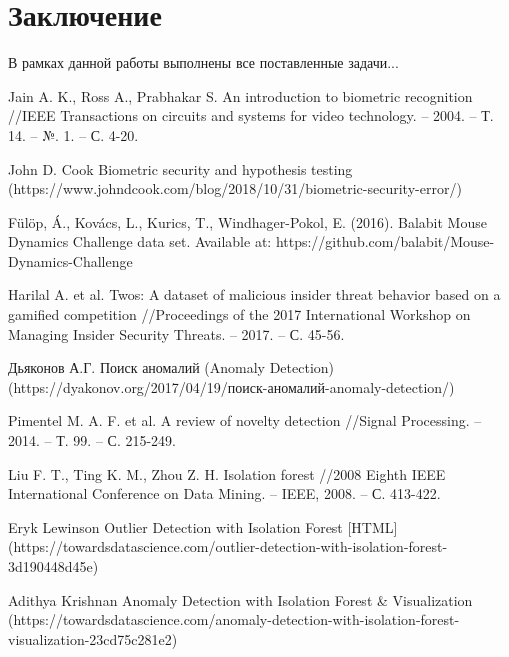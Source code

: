 \documentclass[12pt]{article}
\begin{document}
    \newpage



    \section{Заключение}
    \label{sec:Conclusion}

    \par В рамках данной работы выполнены все поставленные задачи...

    \newpage



    \begin{thebibliography}{20}
        Jain A. K., Ross A., Prabhakar S. An introduction to biometric recognition //IEEE Transactions on circuits and systems for video technology. – 2004. – Т. 14. – №. 1. – С. 4-20.

        John D. Cook Biometric security and hypothesis testing (https://www.johndcook.com/blog/2018/10/31/biometric-security-error/)

        Fülöp, Á., Kovács, L., Kurics, T., Windhager-Pokol, E. (2016). Balabit Mouse Dynamics Challenge data set. Available at: https://github.com/balabit/Mouse-Dynamics-Challenge

        Harilal A. et al. Twos: A dataset of malicious insider threat behavior based on a gamified competition //Proceedings of the 2017 International Workshop on Managing Insider Security Threats. – 2017. – С. 45-56.

        Дьяконов А.Г. Поиск аномалий (Anomaly Detection) (https://dyakonov.org/2017/04/19/поиск-аномалий-anomaly-detection/)

        Pimentel M. A. F. et al. A review of novelty detection //Signal Processing. – 2014. – Т. 99. – С. 215-249.

        Liu F. T., Ting K. M., Zhou Z. H. Isolation forest //2008 Eighth IEEE International Conference on Data Mining. – IEEE, 2008. – С. 413-422.

        Eryk Lewinson Outlier Detection with Isolation Forest [HTML] (https://towardsdatascience.com/outlier-detection-with-isolation-forest-3d190448d45e)

        Adithya Krishnan Anomaly Detection with Isolation Forest & Visualization (https://towardsdatascience.com/anomaly-detection-with-isolation-forest-visualization-23cd75c281e2)


\end{thebibliography}
\end{document}
